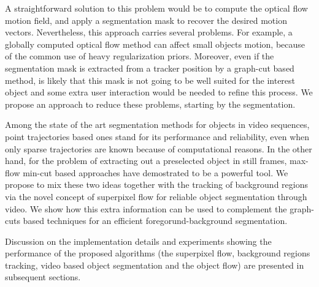 A straightforward solution to this problem would be to compute the optical flow motion field, and apply 
a segmentation mask to recover the desired motion vectors. Nevertheless, this approach carries several 
problems. For example, a globally computed optical flow method can affect small objects motion, because of 
the common use of heavy regularization priors. Moreover, even if the segmentation mask is extracted from a 
tracker position by a graph-cut based method, is likely that this mask is not going to be well suited for the 
interest object and some extra user interaction would be needed to refine this process. We propose an approach 
to reduce these problems, starting by the segmentation.

Among the state of the art segmentation methods for objects in video
sequences, point trajectories based ones stand for its performance and 
reliability, even when only sparse trajectories are known because of
computational reasons. In the other hand, for the problem of extracting out a 
preselected object in still frames, max-flow min-cut based approaches 
have demostrated to be a powerful tool. We propose to mix these two 
ideas together with the tracking of background regions via the novel concept of 
superpixel flow for reliable object segmentation through video. 
We show how this extra information can be used to complement the
graph-cuts based techniques for an efficient foregorund-background segmentation. 

Discussion on the implementation details and experiments showing the performance 
of the proposed algorithms (the superpixel flow, 
background regions tracking, video based object segmentation and the object flow) are 
presented in subsequent sections.

